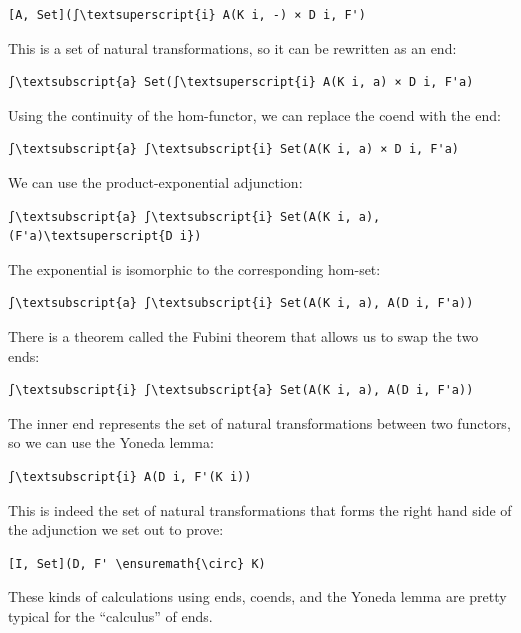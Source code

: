 \begin{Verbatim}[commandchars=\\\{\}]
[A, Set](∫\textsuperscript{i} A(K i, -) × D i, F')
\end{Verbatim}
This is a set of natural transformations, so it can be rewritten as an
end:

\begin{Verbatim}[commandchars=\\\{\}]
∫\textsubscript{a} Set(∫\textsuperscript{i} A(K i, a) × D i, F'a)
\end{Verbatim}
Using the continuity of the hom-functor, we can replace the coend with
the end:

\begin{Verbatim}[commandchars=\\\{\}]
∫\textsubscript{a} ∫\textsubscript{i} Set(A(K i, a) × D i, F'a)
\end{Verbatim}
We can use the product-exponential adjunction:

\begin{Verbatim}[commandchars=\\\{\}]
∫\textsubscript{a} ∫\textsubscript{i} Set(A(K i, a), (F'a)\textsuperscript{D i})
\end{Verbatim}
The exponential is isomorphic to the corresponding hom-set:

\begin{Verbatim}[commandchars=\\\{\}]
∫\textsubscript{a} ∫\textsubscript{i} Set(A(K i, a), A(D i, F'a))
\end{Verbatim}
There is a theorem called the Fubini theorem that allows us to swap the
two ends:

\begin{Verbatim}[commandchars=\\\{\}]
∫\textsubscript{i} ∫\textsubscript{a} Set(A(K i, a), A(D i, F'a))
\end{Verbatim}
The inner end represents the set of natural transformations between two
functors, so we can use the Yoneda lemma:

\begin{Verbatim}[commandchars=\\\{\}]
∫\textsubscript{i} A(D i, F'(K i))
\end{Verbatim}
This is indeed the set of natural transformations that forms the right
hand side of the adjunction we set out to prove:

\begin{Verbatim}[commandchars=\\\{\}]
[I, Set](D, F' \ensuremath{\circ} K)
\end{Verbatim}
These kinds of calculations using ends, coends, and the Yoneda lemma are
pretty typical for the ``calculus'' of ends.

